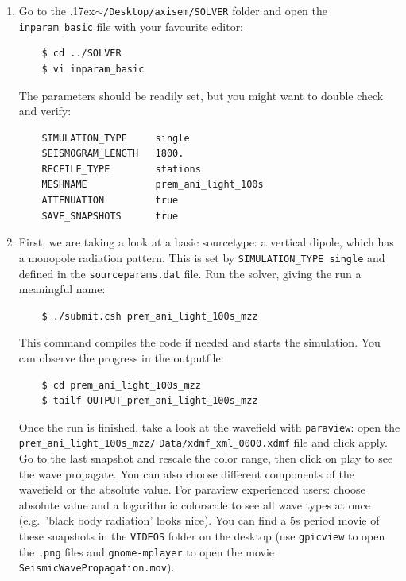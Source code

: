 \documentclass{article}
\newcommand{\ttilde}[0]{\raise.17ex\hbox{$\scriptstyle\sim$}}
\begin{document}
\begin{enumerate}
    \item Go to the \ttilde\verb|/Desktop/axisem/SOLVER| folder and open the
    \verb|inparam_basic| file with your favourite editor:
    \begin{verbatim}
    $ cd ../SOLVER
    $ vi inparam_basic
    \end{verbatim}
    The parameters should be readily set, but you might want to double check and verify:
    \begin{verbatim}
    SIMULATION_TYPE     single
    SEISMOGRAM_LENGTH   1800.
    RECFILE_TYPE        stations
    MESHNAME            prem_ani_light_100s
    ATTENUATION         true
    SAVE_SNAPSHOTS      true
    \end{verbatim}
    \item First, we are taking a look at a basic sourcetype: a vertical dipole, which has
    a monopole radiation pattern. This is set by \verb|SIMULATION_TYPE single| and defined
    in the \verb|sourceparams.dat| file. Run the solver, giving the run a meaningful name:
    \begin{verbatim}
    $ ./submit.csh prem_ani_light_100s_mzz
    \end{verbatim}
    This command compiles the code if needed and starts the simulation. You can observe
    the progress in the outputfile:
    \begin{verbatim}
    $ cd prem_ani_light_100s_mzz
    $ tailf OUTPUT_prem_ani_light_100s_mzz
    \end{verbatim}
    Once the run is finished, take a look at the wavefield with \verb|paraview|: open
    the \verb|prem_ani_light_100s_mzz/| \verb|Data/xdmf_xml_0000.xdmf|
    file and click apply. Go to the last snapshot and rescale the color range,
    then click on play to see the wave propagate.  You can also choose
    different components of the wavefield or the absolute value.  For paraview
    experienced users: choose absolute value and a logarithmic colorscale to
    see all wave types at once (e.g.\ 'black body radiation' looks nice).  You
    can find a 5s period movie of these snapshots in the \verb|VIDEOS| folder on
    the desktop (use \verb|gpicview| to open the \verb|.png| files and
    \verb|gnome-mplayer| to open the movie \verb|SeismicWavePropagation.mov|).


\end{enumerate}
\end{document}
